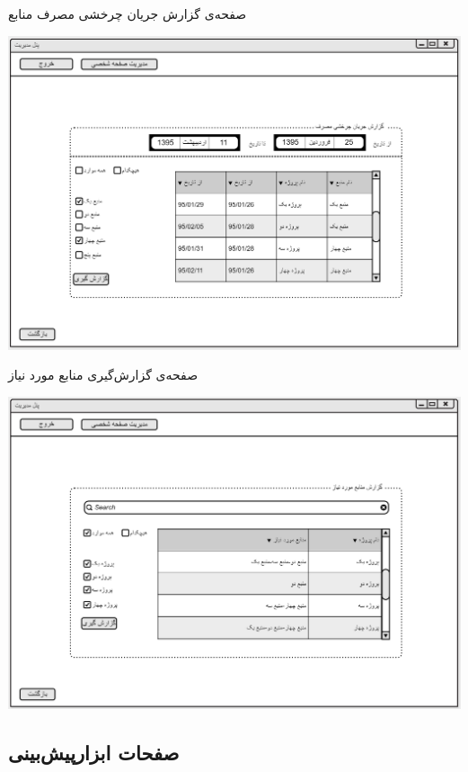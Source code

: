 \vspace{1cm}
صفحه‌ی گزارش جریان چرخشی مصرف منابع
\begin{center}
\includegraphics[width=\textwidth]{Prototype/Reporting/ResourceUsageReport.png}
\end{center}

\newpage
\vspace{1cm}
صفحه‌ی گزارش‌گیری منابع مورد نیاز
\begin{center}
\includegraphics[width=\textwidth]{Prototype/Reporting/ResourceRequirementsReport.png}
\end{center}

\newpage
\subsection{صفحات ابزارپیش‌بینی }

